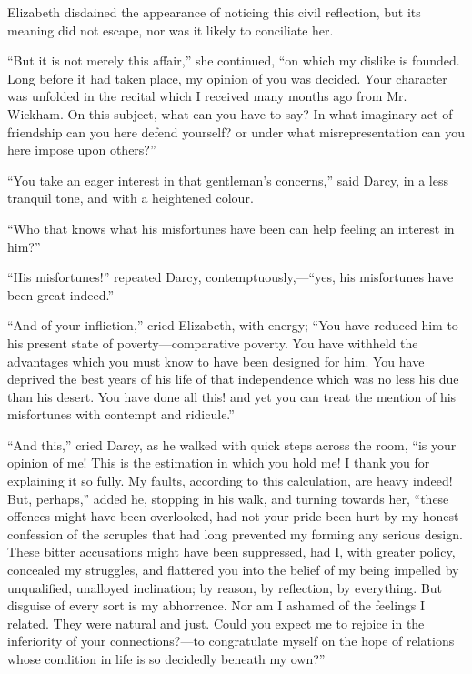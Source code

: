 \documentclass[10pt]{book}
\begin{document}
   Elizabeth disdained the appearance of noticing this civil reflection,
but its meaning did not escape, nor was it likely to conciliate her.
  

   “But it is not merely this affair,” she continued, “on which my dislike
is founded. Long before it had taken
   place, my opinion of you was
decided. Your character was unfolded in the recital which I received
many months ago from Mr. Wickham. On this subject, what can you have to
say? In what imaginary act of friendship can you here defend yourself?
or under what misrepresentation can you here impose upon others?”
  

   “You take an eager interest in that gentleman’s concerns,” said Darcy,
in a less tranquil tone, and with a heightened colour.
  

   “Who that knows what his misfortunes have been can help feeling an
interest in him?”
  

   “His misfortunes!” repeated Darcy, contemptuously,—“yes, his
misfortunes have been great indeed.”
  

   “And of your infliction,” cried Elizabeth, with energy; “You have
reduced him to his present state of poverty—comparative poverty. You
have withheld the advantages which you must know to have been designed
for him. You have deprived the best years of his life of that
independence which was no less his due than his desert. You have done
all this! and yet you can treat the mention of his misfortunes with
contempt and ridicule.”
  

   “And this,” cried Darcy, as he walked with quick steps across the room,
“is your opinion of me! This is the estimation in which you hold me! I
thank you for explaining it so fully. My faults, according to this
calculation, are heavy indeed! But, perhaps,” added he, stopping in his
walk, and turning towards her, “these offences might have been
overlooked, had not your pride been hurt by my honest confession of the
scruples that had long prevented my forming any serious design. These
bitter accusations might have been suppressed, had I, with greater
policy, concealed my struggles, and
   flattered you into the belief of my
being impelled by unqualified, unalloyed inclination; by reason, by
reflection, by everything. But disguise of every sort is my abhorrence.
Nor am I ashamed of the feelings I related. They were natural and just.
Could you expect me to rejoice in the inferiority of your
connections?—to congratulate myself on the hope of relations whose
condition in life is so decidedly beneath my own?”
  
\end{document}
